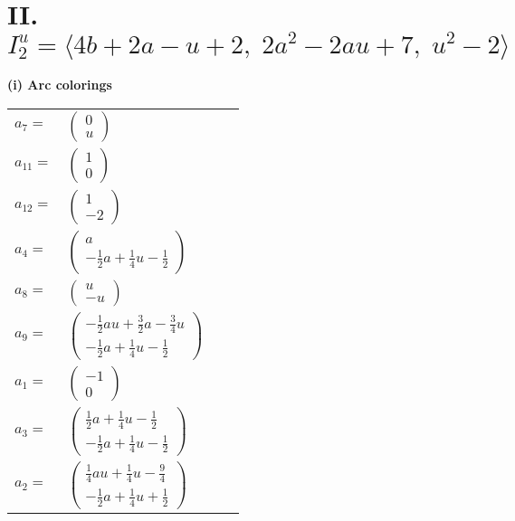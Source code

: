 \documentclass[1p]{elsarticle_modified}
\theoremstyle{definition}
\begin{document}
\centering \section*{II. $I^u_{2}= \langle 4 b+2 a- u+2,\;2 a^2-2 a u+7,\;u^2-2 \rangle$}
\flushleft \textbf{(i) Arc colorings}\\
\begin{tabular}{m{7pt} m{180pt} m{7pt} m{180pt} }
\flushright $a_{7}=$&$\begin{pmatrix}0\\u\end{pmatrix}$ \\
\flushright $a_{11}=$&$\begin{pmatrix}1\\0\end{pmatrix}$ \\
\flushright $a_{12}=$&$\begin{pmatrix}1\\-2\end{pmatrix}$ \\
\flushright $a_{4}=$&$\begin{pmatrix}a\\-\frac{1}{2} a+\frac{1}{4} u-\frac{1}{2}\end{pmatrix}$ \\
\flushright $a_{8}=$&$\begin{pmatrix}u\\- u\end{pmatrix}$ \\
\flushright $a_{9}=$&$\begin{pmatrix}-\frac{1}{2} a u+\frac{3}{2} a-\frac{3}{4} u\\-\frac{1}{2} a+\frac{1}{4} u-\frac{1}{2}\end{pmatrix}$ \\
\flushright $a_{1}=$&$\begin{pmatrix}-1\\0\end{pmatrix}$ \\
\flushright $a_{3}=$&$\begin{pmatrix}\frac{1}{2} a+\frac{1}{4} u-\frac{1}{2}\\-\frac{1}{2} a+\frac{1}{4} u-\frac{1}{2}\end{pmatrix}$ \\
\flushright $a_{2}=$&$\begin{pmatrix}\frac{1}{4} a u+\frac{1}{4} u-\frac{9}{4}\\-\frac{1}{2} a+\frac{1}{4} u+\frac{1}{2}\end{pmatrix}$ \\

\end{tabular}
\end{document}
